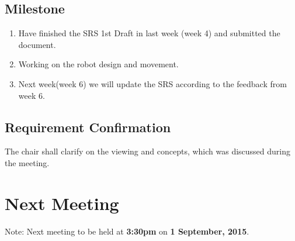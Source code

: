 \documentclass[a4paper] {article}
\begin{document}
   \subsection{Milestone}
	\begin{enumerate}
		\item Have finished the SRS 1st Draft in last week (week 4) and submitted the document.
		\item Working on the robot design and movement.
		\item Next week(week 6) we will update the SRS according to the feedback from week 6.
   \end{enumerate}
   
   \subsection{Requirement Confirmation}
	The chair shall clarify on the viewing and concepts, which was discussed during the meeting.
   
	\section{Next Meeting}
	Note: Next meeting to be held at \textbf{3:30pm} on \textbf {1 September, 2015}. 
	
\end{document}
